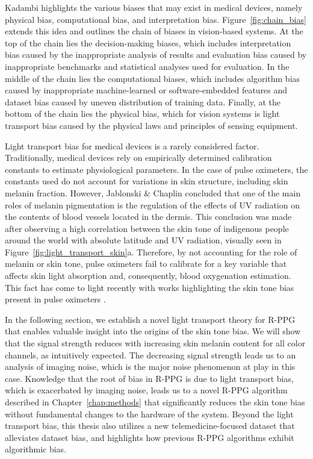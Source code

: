 Kadambi \cite{kadambi_achieving_2021} highlights the various biases that may exist in medical devices, namely physical bias, computational bias, and interpretation bias. Figure~\ref{fig:chain_bias} extends this idea and outlines the chain of biases in vision-based systems. At the top of the chain lies the decision-making biases, which includes interpretation bias caused by the inappropriate analysis of results and evaluation bias caused by inappropriate benchmarks and statistical analyses used for evaluation. In the middle of the chain lies the computational biases, which includes algorithm bias caused by inappropriate machine-learned or software-embedded features and dataset bias caused by uneven distribution of training data. Finally, at the bottom of the chain lies the physical bias, which for vision systems is light transport bias caused by the physical laws and principles of sensing equipment. 

Light transport bias for medical devices is a rarely considered factor. Traditionally, medical devices rely on empirically determined calibration constants to estimate physiological parameters. In the case of pulse oximeters, the constants used do not account for variations in skin structure, including skin melanin fraction. However, Jablonski \& Chaplin \cite{jablonski_evolution_2000} concluded that one of the main roles of melanin pigmentation is the regulation of the effects of UV radiation on the contents of blood vessels located in the dermis. This conclusion was made after observing a high correlation between the skin tone of indigenous people around the world with absolute latitude and UV radiation, visually seen in Figure~\ref{fig:light_transport_skin}a. Therefore, by not accounting for the role of melanin or skin tone, pulse oximeters fail to calibrate for a key variable that affects skin light absorption and, consequently, blood oxygenation estimation. This fact has come to light recently with works highlighting the skin tone bias present in pulse oximeters \cite{sjoding_racial_2020}. 

In the following section, we establish a novel light transport theory for R-PPG that enables valuable insight into the origins of the skin tone bias. We will show that the signal strength reduces with increasing skin melanin content for all color channels, as intuitively expected. The decreasing signal strength leads us to an analysis of imaging noise, which is the major noise phenomenon at play in this case. Knowledge that the root of bias in R-PPG is due to light transport bias, which is exacerbated by imaging noise, leads us to a novel R-PPG algorithm described in Chapter~\ref{chap:methods} that significantly reduces the skin tone bias without fundamental changes to the hardware of the system. Beyond the light transport bias, this thesis also utilizes a new telemedicine-focused dataset that alleviates dataset bias, and highlights how previous R-PPG algorithms exhibit algorithmic bias. 

